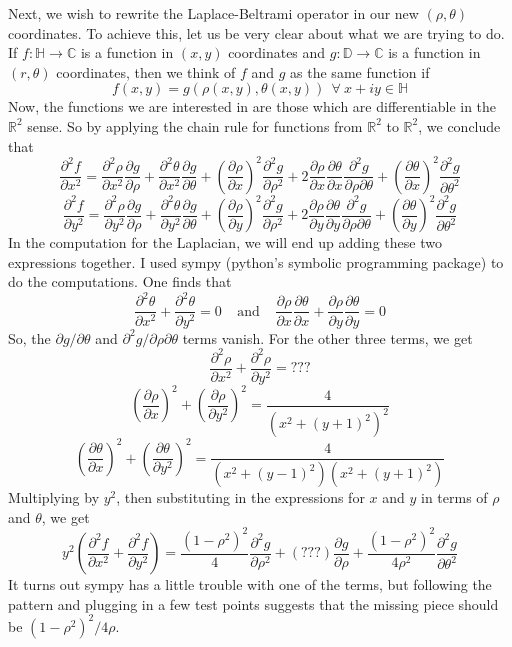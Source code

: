 \documentclass[]{article}
\begin{document}
Next, we wish to rewrite the Laplace-Beltrami operator in our new $(\rho, \theta)$ coordinates.
To achieve this, let us be very clear about what we are trying to do.
If $f : \mathbb{H} \rightarrow \mathbb{C}$ is a function in $(x, y)$ coordinates and $g : \mathbb{D} \rightarrow \mathbb{C}$ is a function in $(r, \theta)$ coordinates, then we think of $f$ and $g$ as the same function if
$$
f(x, y) = g(\rho(x, y), \theta(x, y)) ~~\forall~x + iy \in \mathbb{H}
$$
Now, the functions we are interested in are those which are differentiable in the $\mathbb{R}^2$ sense.
So by applying the chain rule for functions from $\mathbb{R}^2$ to $\mathbb{R}^2$, we conclude that
$$
\frac{\partial^2f}{\partial x^2} =
\frac{\partial^2\rho}{\partial x^2}\frac{\partial g}{\partial\rho} +
\frac{\partial^2\theta}{\partial x^2}\frac{\partial g}{\partial\theta} +
\left(\frac{\partial\rho}{\partial x}\right)^2\frac{\partial^2 g}{\partial\rho^2} +
2\frac{\partial\rho}{\partial x}\frac{\partial\theta}{\partial x}\frac{\partial^2 g}{\partial\rho\partial\theta} +
\left(\frac{\partial\theta}{\partial x}\right)^2\frac{\partial^2 g}{\partial\theta^2} $$$$
\frac{\partial^2f}{\partial y^2} =
\frac{\partial^2\rho}{\partial y^2}\frac{\partial g}{\partial\rho} +
\frac{\partial^2\theta}{\partial y^2}\frac{\partial g}{\partial\theta} +
\left(\frac{\partial\rho}{\partial y}\right)^2\frac{\partial^2 g}{\partial\rho^2} +
2\frac{\partial\rho}{\partial y}\frac{\partial\theta}{\partial y}\frac{\partial^2 g}{\partial\rho\partial\theta} +
\left(\frac{\partial\theta}{\partial y}\right)^2\frac{\partial^2 g}{\partial\theta^2}
$$
In the computation for the Laplacian, we will end up adding these two expressions together.
I used sympy (python's symbolic programming package) to do the computations.
One finds that
$$
\frac{\partial^2\theta}{\partial x^2} + \frac{\partial^2\theta}{\partial y^2} = 0
~~~~~ \text{and} ~~~~~
\frac{\partial\rho}{\partial x}\frac{\partial\theta}{\partial x} +
\frac{\partial\rho}{\partial y}\frac{\partial\theta}{\partial y} = 0
$$
So, the $\partial g/\partial\theta$ and $\partial^2g/\partial\rho\partial\theta$ terms vanish.
For the other three terms, we get
$$
\frac{\partial^2\rho}{\partial x^2} + \frac{\partial^2\rho}{\partial y^2} = \textbf{???} $$$$
\left( \frac{\partial\rho}{\partial x} \right)^2 + \left(\frac{\partial\rho}{\partial y^2}\right)^2 = \frac{4}{(x^2 + (y+1)^2)^2} $$$$
\left( \frac{\partial\theta}{\partial x} \right)^2 + \left(\frac{\partial\theta}{\partial y^2}\right)^2 = \frac{4}{(x^2 + (y-1)^2)(x^2 + (y+1)^2)}
$$
Multiplying by $y^2$, then substituting in the expressions for $x$ and $y$ in terms of $\rho$ and $\theta$, we get
$$
y^2\left(\frac{\partial^2f}{\partial x^2} + \frac{\partial^2f}{\partial y^2}\right) =
\frac{(1 - \rho^2)^2}{4}\frac{\partial^2g}{\partial\rho^2} +
(\textbf{???})\frac{\partial g}{\partial \rho} +
\frac{(1 - \rho^2)^2}{4\rho^2}\frac{\partial^2g}{\partial\theta^2}
$$
It turns out sympy has a little trouble with one of the terms, but following the pattern and plugging in a few test points suggests that the missing piece should be $(1-\rho^2)^2/4\rho$.
\end{document}

